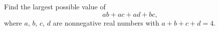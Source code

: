Find the largest possible value of
\[ab+ac+ad+bc,\]
where $a$, $b$, $c$, $d$ are nonnegative real numbers with $a+b+c+d=4$.
